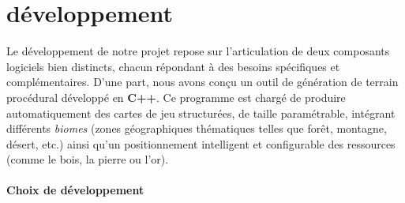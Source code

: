 \section{développement}
Le développement de notre projet repose sur l’articulation de deux composants logiciels bien distincts, chacun répondant à des besoins spécifiques et complémentaires. D’une part, nous avons conçu un outil de génération de terrain procédural développé en \textbf{C++}. Ce programme est chargé de produire automatiquement des cartes de jeu structurées, de taille paramétrable, intégrant différents \textit{biomes} (zones géographiques thématiques telles que forêt, montagne, désert, etc.) ainsi qu’un positionnement intelligent et configurable des ressources (comme le bois, la pierre ou l’or).

\paragraph{Choix de développement}

